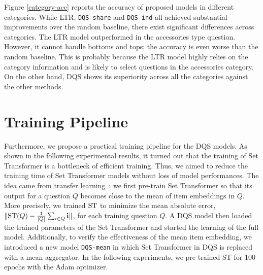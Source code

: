 Figure \ref{category-acc} reports the accuracy of proposed models in different categories. 
While LTR, \texttt{DQS-share} and \texttt{DQS-ind} all achieved substantial improvements over the random baseline, 
there exist significant differences across categories.
The LTR model outperformed in the accessories type question. However, it cannot handle bottoms and tops; the accuracy is even worse than the random baseline. 
This is probably because the LTR model highly relies on the category information and is likely to select questions in the accessories category.
On the other hand, DQS shows its superiority across all the categories against the other methods.


\section{Training Pipeline}
\label{sq:training_pipeline}


Furthermore, we propose a practical training pipeline for the DQS models. 
As shown in the following experimental results, it turned out that the training of Set Transformer is a bottleneck of efficient training. 
Thus, we aimed to reduce the training time of Set Transformer models without loss of model performances. 
The idea came from transfer learning~\cite{pan2009survey}:
we first pre-train Set Transformer so that its output for a question $Q$
becomes close to the mean of item embeddings in $Q$.
More precisely, we trained ${\rm ST}$ to minimize the mean absolute error,
$\| {\rm ST}(Q) - \frac{1}{|Q|}\sum_{i \in Q} {\mathbf i} \|$,
for each training question $Q$.
A DQS model then loaded the trained parameters of the Set Transformer and started the learning of the full model. 
Additionally, to verify the effectiveness of the mean item embedding, 
we introduced a new model \texttt{DQS-mean}
in which Set Transformer in DQS is replaced with a mean aggregator. 
In the following experiments, we pre-trained {\rm ST} for 100 epochs with the Adam optimizer.



